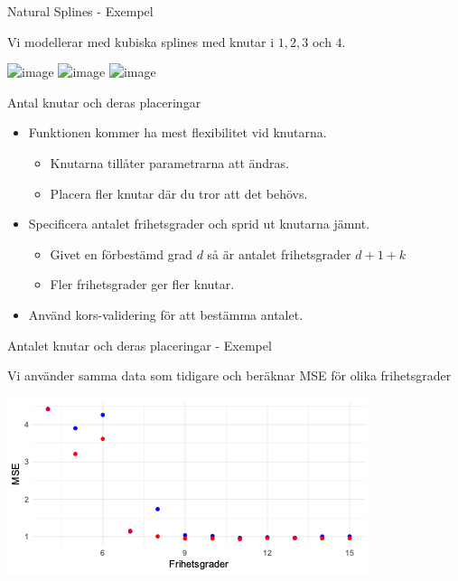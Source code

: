 \documentclass[10pt,english]{beamer}
\begin{document}
\begin{frame}{Natural Splines - Exempel}

    Vi modellerar med kubiska splines med knutar i $1,2,3$ och $4$.


    
    \includegraphics<1>[width=\textwidth]{figs/nonLinPeceBS.png}
    \includegraphics<2>[width=\textwidth]{figs/nonLinPeceBSNS.png}
    \includegraphics<3>[width=\textwidth]{figs/nonLinPeceBSNS2.png}

\end{frame}

\begin{frame}{Antal knutar och deras placeringar}
    
\begin{itemize}
    \item Funktionen kommer ha mest flexibilitet vid knutarna.
    \begin{itemize}
        \item Knutarna tillåter parametrarna att ändras.
        \item Placera fler knutar där du tror att det behövs.
    \end{itemize}
    \item Specificera antalet frihetsgrader och sprid ut knutarna jämnt.
    \begin{itemize}
        \item Givet en förbestämd grad $d$ så är antalet frihetsgrader $d+1+k$
        \item Fler frihetsgrader ger fler knutar.
    \end{itemize}
    \item Använd kors-validering för att bestämma antalet.
\end{itemize}

\end{frame}

\begin{frame}{Antalet knutar och deras placeringar - Exempel}

    Vi använder samma data som tidigare och beräknar MSE för olika frihetsgrader

    \includegraphics[width=\textwidth]{figs/bsnsMSE.png}
    

\end{frame}
\end{document}
